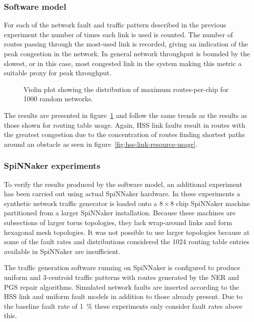 			\subsubsection{Software model}
			
				For each of the network fault and traffic pattern described in the
				previous experiment the number of times each link is used is counted.
				The number of routes passing through the most-used link is recorded,
				giving an indication of the peak congestion in the network.  In general
				network throughput is bounded by the slowest, or in this case, most
				congested link in the system \cite{dally04} making this metric a
				suitable proxy for peak throughput.
				
				\begin{figure}
					\center
					
					\caption{Violin plot showing the distribution of maximum
					routes-per-chip for \num{1000} random networks.}
					\label{fig:routing-resource}
				\end{figure}
				
				The results are presented in figure~\ref{fig:routing-resource} and
				follow the same trends as the results as those shown for routing table
				usage.  Again, HSS link faults result in routes with the greatest
				congestion due to the concentration of routes finding shortest paths
				around an obstacle as seen in figure~\ref{fig:hss-link-resource-usage}.
			
			\subsubsection{SpiNNaker experiments}
			
				To verify the results produced by the software model, an additional
				experiment has been carried out using actual SpiNNaker hardware. In
				these experiments a synthetic network traffic generator is loaded onto
				a $8\times8$ chip SpiNNaker machine partitioned from a larger SpiNNaker
				installation.  Because these machines are subsections of larger torus
				topologies, they lack wrap-around links and form hexagonal mesh
				topologies. It was not possible to use larger topologies because at
				some of the fault rates and distributions considered the \num{1024}
				routing table entries available in SpiNNaker are insufficient.
				
				The traffic generation software running on SpiNNaker is configured to
				produce uniform and 3-centroid traffic patterns with routes generated
				by the NER and PGS repair algorithms. Simulated network faults are
				inserted according to the HSS link and uniform fault models in addition
				to those already present. Due to the baseline fault rate of
				\SI{1}{\percent} these experiments only consider fault rates above
				this.
				
